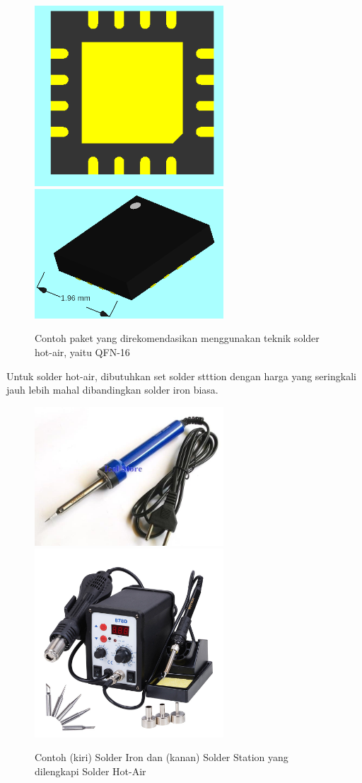 \documentclass[12pt,]{article}
\begin{document}
	\begin{figure}[!ht]
		\centering
		\includegraphics[width=200pt]{images/qfn16-bottom}
		\includegraphics[width=200pt]{images/qfn16-ortho}
		\caption{Contoh paket yang direkomendasikan menggunakan teknik solder hot-air, yaitu QFN-16}
	\end{figure}

	Untuk solder hot-air, dibutuhkan set solder stttion dengan harga yang seringkali jauh lebih mahal dibandingkan solder iron biasa.
	 
	\begin{figure}[!ht]
		\centering
		\includegraphics[width=200pt]{images/solder_iron}
		\includegraphics[width=200pt]{images/solder_station}
		\caption{Contoh (kiri) Solder Iron dan (kanan) Solder Station yang dilengkapi Solder Hot-Air}
	\end{figure}
	
\end{document}
